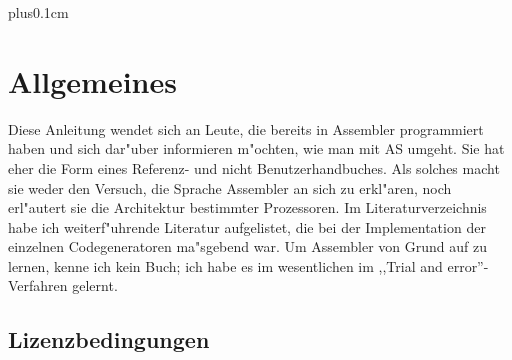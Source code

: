 \documentclass[12pt,a4paper,twoside]{report}
\newif\ifelektor
\begin{document}
\clearpage


\ifelektor
\thispagestyle{empty} \
\clearpage
\thispagestyle{empty} \
\clearpage
\fi


{\parskip 0cm plus0.1cm \tableofcontents}


\cleardoublepage
\chapter{Allgemeines}

Diese Anleitung wendet sich an Leute, die bereits in Assembler programmiert
haben und sich dar"uber informieren m"ochten, wie man mit AS umgeht.  Sie
hat eher die Form eines Referenz- und nicht Benutzerhandbuches.  Als solches
macht sie weder den Versuch, die Sprache Assembler an sich zu erkl"aren, noch
erl"autert sie die Architektur bestimmter Prozessoren.  Im Literaturverzeichnis
habe ich weiterf"uhrende Literatur aufgelistet, die bei der Implementation der
einzelnen Codegeneratoren ma"sgebend war.  Um Assembler von Grund auf zu
lernen, kenne ich kein Buch; ich habe es im wesentlichen im ,,Trial and
error''-Verfahren gelernt.


\section{Lizenzbedingungen}
\label{SectLicense}
\end{document}
